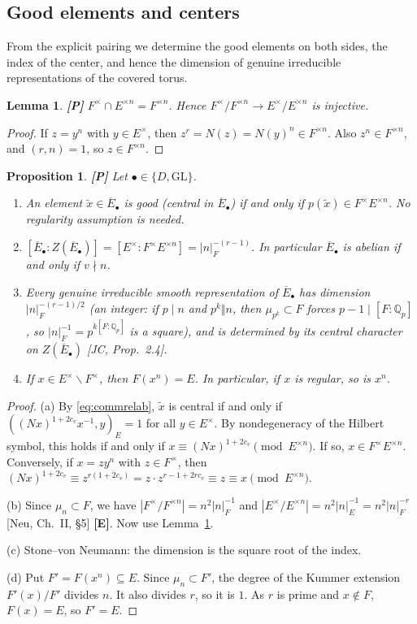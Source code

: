 \documentclass[12pt]{article}
\newcommand{\ov}[1]{\overline{#1}}
\newcommand{\GL}{\mathrm{GL}}
\newcommand{\Eb}{\ov{E}}
\newcommand{\Pv}{\textbf{[P]}}
\newcommand{\Ev}{\textbf{[E]}}
\theoremstyle{plain}
\newtheorem{proposition}[theorem]{Proposition}
\newtheorem{lemma}[theorem]{Lemma}
\theoremstyle{definition}
\begin{document}
\subsection{Good elements and centers}\label{subsec:good}
From the explicit pairing we determine the good elements on both sides, the index of the center, and hence the dimension of genuine irreducible representations of the covered torus.

\begin{lemma}\label{lem:FcapEn}\Pv
$F^\times\cap E^{\times n}=F^{\times n}$. Hence $F^\times/F^{\times n}\to E^\times/E^{\times n}$ is injective.
\end{lemma}
\begin{proof}
If $z=y^n$ with $y\in E^\times$, then $z^r=N(z)=N(y)^n\in F^{\times n}$. Also $z^n\in F^{\times n}$, and $(r,n)=1$, so $z\in F^{\times n}$.
\end{proof}

\begin{proposition}\label{prop:good}\Pv
Let $\bullet\in\{D,\GL\}$.
\begin{enumerate}[label=(\alph*)]
\item An element $\tilde x\in\Eb_\bullet$ is good (central in $\Eb_\bullet$) if and only if $p(\tilde x)\in F^\times E^{\times n}$. No regularity assumption is needed.
\item $[\Eb_\bullet:Z(\Eb_\bullet)]=[E^\times:F^\times E^{\times n}]=|n|_F^{-(r-1)}$. In particular $\Eb_\bullet$ is abelian if and only if $v\nmid n$.
\item Every genuine irreducible smooth representation of $\Eb_\bullet$ has dimension $|n|_F^{-(r-1)/2}$ (an integer: if $p\mid n$ and $p^k\Vert n$, then $\mu_{p^k}\subset F$ forces $p-1\mid[F:\mathbb Q_p]$, so $|n|_F^{-1}=p^{k[F:\mathbb Q_p]}$ is a square), and is determined by its central character on $Z(\Eb_\bullet)$ [JC, Prop.~2.4].
\item If $x\in E^\times\smallsetminus F^\times$, then $F(x^n)=E$. In particular, if $x$ is regular, so is $x^n$.
\end{enumerate}
\end{proposition}

\begin{proof}
(a) By \eqref{eq:commrelab}, $\tilde x$ is central if and only if $((Nx)^{1+2c_v}x^{-1},y)_E=1$ for all $y\in E^\times$. By nondegeneracy of the Hilbert symbol, this holds if and only if $x\equiv(Nx)^{1+2c_v}\pmod{E^{\times n}}$. If so, $x\in F^\times E^{\times n}$. Conversely, if $x=zy^n$ with $z\in F^\times$, then $(Nx)^{1+2c_v}\equiv z^{r(1+2c_v)}=z\cdot z^{r-1+2rc_v}\equiv z\equiv x\pmod{E^{\times n}}$.

(b) Since $\mu_n\subset F$, we have $|F^\times/F^{\times n}|=n^2|n|_F^{-1}$ and $|E^\times/E^{\times n}|=n^2|n|_E^{-1}=n^2|n|_F^{-r}$ [Neu, Ch.~II, \S5] \Ev. Now use Lemma~\ref{lem:FcapEn}.

(c) Stone--von Neumann: the dimension is the square root of the index.

(d) Put $F'=F(x^n)\subseteq E$. Since $\mu_n\subset F'$, the degree of the Kummer extension $F'(x)/F'$ divides $n$. It also divides $r$, so it is $1$. As $r$ is prime and $x\notin F$, $F(x)=E$, so $F'=E$.
\end{proof}
\end{document}
